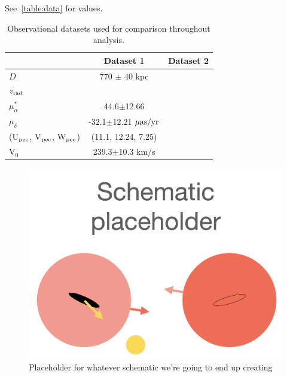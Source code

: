 \documentclass[twocolumn]{aastex631}
\newcommand{\mud}{\mu_\delta}
\newcommand{\mua}{\mu_\alpha^*}
\begin{document}
See~\ref{table:data} for values.
\begin{table}
  \centering
  \begin{tabular}{lc|c}
    \hline\hline
                    & Dataset 1                     & Dataset 2 \\\hline
  $D$               &  770 $\pm$ 40 \rm kpc\cite{}     &           \\
  $v_{\rm rad}$     &           &           \\
  $\mu_\alpha^*$    & 44.6$\pm$12.66\cite{} \\
  $\mu_\delta$      & -32.1$\pm$12.21 $\mu\rm as/yr$ & \\
  (U$_{\rm pec}$, V$_{\rm pec}$, W$_{\rm pec}$) & (11.1, 12.24, 7.25)& \\
  V$_0$             & 239.3$\pm$10.3 km/s & \\
  \hline\hline
  
  \end{tabular}
  \caption{Observational datasets used for comparison throughout analysis.}
\end{table}


\begin{figure}[htb]
    \centering
    \includegraphics[width=0.8\columnwidth]{schematic_placeholder.png}
    \caption{\label{fig:schematic} Placeholder for whatever schematic we're going to end up creating
    }
  \end{figure}
\end{document}
